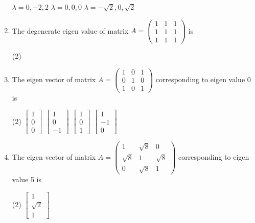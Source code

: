\begin{enumerate}
\begin{tasks}
		\task[\textbf{b.}]$\lambda=0,-2,2$
		\task[\textbf{c.}] $\lambda=0,0,0$
		\task[\textbf{d.}] $\lambda=-\sqrt{2}, 0, \sqrt{2}$
	\end{tasks}
	\item The degenerate eigen value of matrix $A=\left(\begin{array}{lll}1 & 1 & 1 \\ 1 & 1 & 1 \\ 1 & 1 & 1\end{array}\right)$ is
	 \begin{tasks}(2)
	\end{tasks}
	\item The eigen vector of matrix $A=\left(\begin{array}{lll}1 & 0 & 1 \\ 0 & 1 & 0 \\ 1 & 0 & 1\end{array}\right)$ corresponding to eigen value 0 is
	 \begin{tasks}(2)
		\task[\textbf{a.}] $\left[\begin{array}{l}1 \\ 0 \\ 0\end{array}\right]$
		\task[\textbf{b.}]$\left[\begin{array}{c}1 \\ 0 \\ -1\end{array}\right]$
		\task[\textbf{c.}] $\left[\begin{array}{l}1 \\ 0 \\ 1\end{array}\right]$
		\task[\textbf{d.}]  $\left[\begin{array}{c}1 \\ -1 \\ 0\end{array}\right]$
	\end{tasks}
	\item The eigen vector of matrix $A=\left(\begin{array}{ccc}1 & \sqrt{8} & 0 \\ \sqrt{8} & 1 & \sqrt{8} \\ 0 & \sqrt{8} & 1\end{array}\right)$ corresponding to eigen value 5 is
	 \begin{tasks}(2)
		\task[\textbf{a.}]$\left[\begin{array}{c}1 \\ \sqrt{2} \\ 1\end{array}\right]$

\end{tasks}
\end{enumerate}
